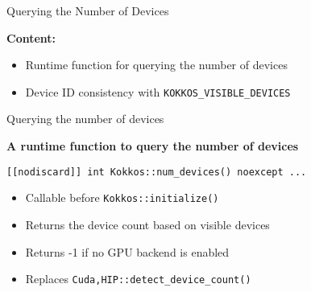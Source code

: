 

\begin{frame}[fragile]

  {\Huge Querying the Number of Devices}

  \vspace{10pt}

	\textbf{Content:}
  \begin{itemize}
    \item Runtime function for querying the number of devices
    \item Device ID consistency with \texttt{KOKKOS\_VISIBLE\_DEVICES}
  \end{itemize}

\end{frame}


\begin{frame}[fragile]{Querying the number of devices}

\textbf{A runtime function to query the number of devices}
\bigskip

\texttt{[[nodiscard]] int Kokkos::num\_devices() noexcept {...}}
\vspace{10pt}

\begin{itemize}
	\item Callable before \texttt{Kokkos::initialize()}
	\item Returns the device count based on visible devices
	\item Returns -1 if no GPU backend is enabled
	\item Replaces \texttt{{Cuda,HIP}::detect\_device\_count()}
\end{itemize}

\end{frame}


